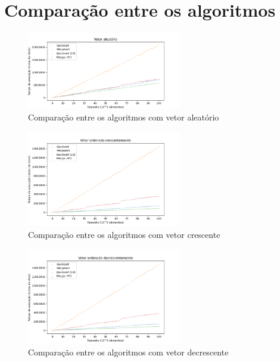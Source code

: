 \documentclass[12pt]{article}
\begin{document}
\section{Comparação entre os algoritmos}

\begin{figure}[H]
    \centering
    \includegraphics[width=0.6\textwidth]{random_benchmark.png}
    \caption{Comparação entre os algoritmos com vetor aleatório}
    \label{fig:exemplo}
\end{figure}

\begin{figure}[H]
    \centering
    \includegraphics[width=0.6\textwidth]{ascending_benchmark.png}
    \caption{Comparação entre os algoritmos com vetor crescente}
    \label{fig:exemplo}
\end{figure}


\begin{figure}[H]
    \centering
    \includegraphics[width=0.6\textwidth]{descending_benchmark.png}
    \caption{Comparação entre os algoritmos com vetor decrescente}
    \label{fig:exemplo}
\end{figure}
\end{document}
